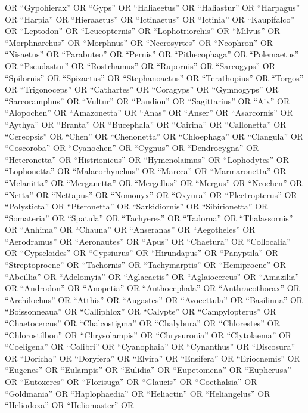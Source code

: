 \documentclass[
  number,
  review,
  onecolumn]{elsarticle}
\begin{document}
OR ``Gypohierax'' OR ``Gyps'' OR ``Haliaeetus'' OR ``Haliastur'' OR
``Harpagus'' OR ``Harpia'' OR ``Hieraaetus'' OR ``Ictinaetus'' OR
``Ictinia'' OR ``Kaupifalco'' OR ``Leptodon'' OR ``Leucopternis'' OR
``Lophotriorchis'' OR ``Milvus'' OR ``Morphnarchus'' OR ``Morphnus'' OR
``Necrosyrtes'' OR ``Neophron'' OR ``Nisaetus'' OR ``Parabuteo'' OR
``Pernis'' OR ``Pithecophaga'' OR ``Polemaetus'' OR ``Pseudastur'' OR
``Rostrhamus'' OR ``Rupornis'' OR ``Sarcogyps'' OR ``Spilornis'' OR
``Spizaetus'' OR ``Stephanoaetus'' OR ``Terathopius'' OR ``Torgos'' OR
``Trigonoceps'' OR ``Cathartes'' OR ``Coragyps'' OR ``Gymnogyps'' OR
``Sarcoramphus'' OR ``Vultur'' OR ``Pandion'' OR ``Sagittarius'' OR
``Aix'' OR ``Alopochen'' OR ``Amazonetta'' OR ``Anas'' OR ``Anser'' OR
``Asarcornis'' OR ``Aythya'' OR ``Branta'' OR ``Bucephala'' OR
``Cairina'' OR ``Callonetta'' OR ``Cereopsis'' OR ``Chen'' OR
``Chenonetta'' OR ``Chloephaga'' OR ``Clangula'' OR ``Coscoroba'' OR
``Cyanochen'' OR ``Cygnus'' OR ``Dendrocygna'' OR ``Heteronetta'' OR
``Histrionicus'' OR ``Hymenolaimus'' OR ``Lophodytes'' OR ``Lophonetta''
OR ``Malacorhynchus'' OR ``Mareca'' OR ``Marmaronetta'' OR ``Melanitta''
OR ``Merganetta'' OR ``Mergellus'' OR ``Mergus'' OR ``Neochen'' OR
``Netta'' OR ``Nettapus'' OR ``Nomonyx'' OR ``Oxyura'' OR
``Plectropterus'' OR ``Polysticta'' OR ``Pteronetta'' OR
``Sarkidiornis'' OR ``Sibirionetta'' OR ``Somateria'' OR ``Spatula'' OR
``Tachyeres'' OR ``Tadorna'' OR ``Thalassornis'' OR ``Anhima'' OR
``Chauna'' OR ``Anseranas'' OR ``Aegotheles'' OR ``Aerodramus'' OR
``Aeronautes'' OR ``Apus'' OR ``Chaetura'' OR ``Collocalia'' OR
``Cypseloides'' OR ``Cypsiurus'' OR ``Hirundapus'' OR ``Panyptila'' OR
``Streptoprocne'' OR ``Tachornis'' OR ``Tachymarptis'' OR ``Hemiprocne''
OR ``Abeillia'' OR ``Adelomyia'' OR ``Aglaeactis'' OR ``Aglaiocercus''
OR ``Amazilia'' OR ``Androdon'' OR ``Anopetia'' OR ``Anthocephala'' OR
``Anthracothorax'' OR ``Archilochus'' OR ``Atthis'' OR ``Augastes'' OR
``Avocettula'' OR ``Basilinna'' OR ``Boissonneaua'' OR ``Calliphlox'' OR
``Calypte'' OR ``Campylopterus'' OR ``Chaetocercus'' OR ``Chalcostigma''
OR ``Chalybura'' OR ``Chlorestes'' OR ``Chlorostilbon'' OR
``Chrysolampis'' OR ``Chrysuronia'' OR ``Clytolaema'' OR ``Coeligena''
OR ``Colibri'' OR ``Cyanophaia'' OR ``Cynanthus'' OR ``Discosura'' OR
``Doricha'' OR ``Doryfera'' OR ``Elvira'' OR ``Ensifera'' OR
``Eriocnemis'' OR ``Eugenes'' OR ``Eulampis'' OR ``Eulidia'' OR
``Eupetomena'' OR ``Eupherusa'' OR ``Eutoxeres'' OR ``Florisuga'' OR
``Glaucis'' OR ``Goethalsia'' OR ``Goldmania'' OR ``Haplophaedia'' OR
``Heliactin'' OR ``Heliangelus'' OR ``Heliodoxa'' OR ``Heliomaster'' OR
\end{document}
